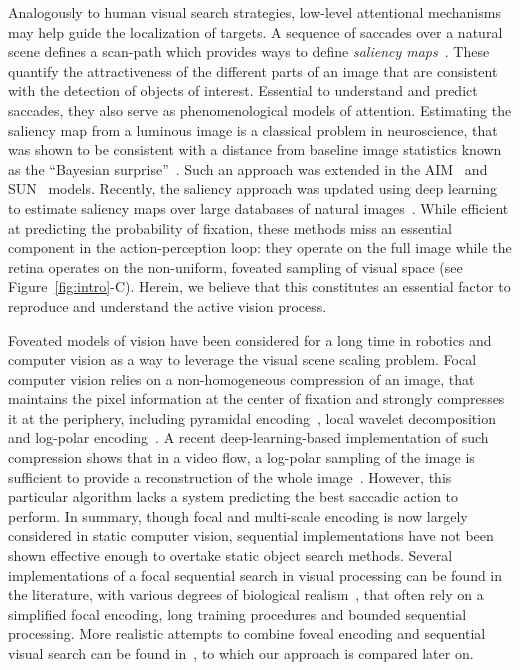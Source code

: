Analogously to human visual search strategies, low-level attentional mechanisms may help guide the localization of targets. A sequence of saccades over a natural scene defines a scan-path which provides ways to define \emph{saliency maps}~\cite{Itti01}. These quantify the attractiveness of the different parts of an image that are consistent with the detection of objects of interest. Essential to understand and predict saccades, they also serve as phenomenological models of attention. Estimating the saliency map from a luminous image is a classical problem in neuroscience, that was shown to be consistent with a distance from baseline image statistics known as the ``Bayesian surprise''~\cite{Itti2009}. Such an approach was extended in the AIM~\cite{Bruce2009} and SUN~\cite{Zhang2008} models. Recently, the saliency approach was updated using deep learning to estimate saliency maps over large databases of natural images~\cite{Kummerer17}. While efficient at predicting the probability of fixation, these methods miss an essential component in the action-perception loop: they operate on the full image while the retina operates on the non-uniform, foveated sampling of visual space (see Figure~\ref{fig:intro}-C). Herein, we believe that this constitutes an essential factor to reproduce and understand the active vision process.

Foveated models of vision have been considered for a long time in robotics and computer vision as a way to leverage the visual scene scaling problem. Focal computer vision relies on a non-homogeneous compression of an image, that maintains the pixel information at the center of fixation and strongly compresses it at the periphery, including pyramidal encoding~\cite{kortum1996implementation,Butko2010infomax}, local wavelet decomposition~\cite{dauce2018active} and log-polar encoding~\cite{Traver10}. A recent deep-learning-based implementation of such compression shows that in a video flow, a log-polar sampling of the image is sufficient to provide a reconstruction of the whole image~\cite{Kaplanyan19}. However, this particular algorithm lacks a system predicting the best saccadic action to perform. In summary, though focal and multi-scale encoding is now largely considered in static computer vision, sequential implementations have not been shown effective enough to overtake static object search methods. Several implementations of a focal sequential search in visual processing can be found in the literature, with various degrees of biological realism~\cite{mnih2014recurrent,fu2017look}, that often rely on a simplified focal encoding, long training procedures and bounded sequential processing. More realistic attempts to combine foveal encoding and sequential visual search can be found in~\cite{Butko2010infomax,denil2012learning}, to which our approach is compared later on.

